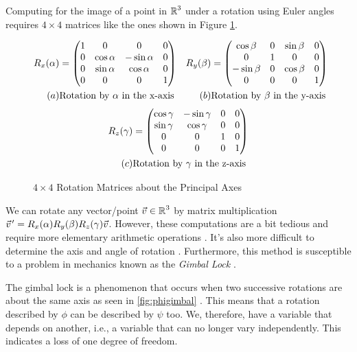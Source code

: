  Computing for the image of a point in $\operatorname{\mathbb{R}}^3$ under a rotation using Euler angles requires $4\times 4$ matrices like the ones shown in Figure \ref{4x4}. 
\begin{figure}[h]
	\begin{align*}
			{R}_{x}{(\alpha)} &=
			\begin{pmatrix}
				1 & 0 & 0 & 0 \\
				0 & \cos{\alpha} & -\sin{\alpha} & 0 \\
				0 & \sin{\alpha} & \cos{\alpha} & 0 \\
				0 & 0 & 0 & 1
			\end{pmatrix}
			&
			{R}_{y}{(\beta)} &=
			\begin{pmatrix}
				\cos{\beta} & 0 & \sin{\beta} & 0 \\
				0 & 1 & 0 & 0 \\
				-\sin{\beta} & 0 & \cos{\beta} & 0 \\
				0 & 0 & 0 & 1
			\end{pmatrix} \\
			(a) & \text{Rotation by $\alpha$ in the x-axis} 
			& 
			(b) & \text{Rotation by $\beta$ in the y-axis}	
	 \end{align*} 
		 \begin{align*}
			{R}_{z}{(\gamma)} &=
			\begin{pmatrix}
				\cos{\gamma} & -\sin{\gamma} & 0 & 0 \\
				\sin{\gamma} & \cos{\gamma} &  0 & 0 \\
				0 & 0 & 1 & 0 \\
				0 & 0 & 0 & 1
		 \end{pmatrix} \\
		 (c) & \text{Rotation by $\gamma$ in the z-axis}	
		\end{align*}
		\caption{$4\times 4$ Rotation Matrices about the Principal Axes}
		\label{4x4}
\end{figure}

We can rotate any vector/point $\vec{v} \in \operatorname{\mathbb{R}}^3$ by matrix multiplication $\pvec{v}' = \Rx{R}{x}{\alpha}\Rx{R}{y}{\beta}\Rx{R}{z}{\gamma}\vec{v}$. However, these computations are a bit tedious and require more elementary arithmetic operations \cite{lerios}. It's also more difficult to determine the axis and angle of rotation \cite{lerios}. Furthermore, this method is susceptible to a problem in mechanics known as the \emph{Gimbal Lock} \cite{jia}.

The gimbal lock is a phenomenon that occurs when two successive rotations are about the same axis as seen in \ref{fig:phigimbal} \cite{goldstein}. This means that a rotation described by $\phi$ can be described by $\psi$ too. We, therefore, have a variable that depends on another, i.e., a variable that can no longer vary independently. This indicates a loss of one degree of freedom. 

